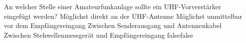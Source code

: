     {An welcher Stelle einer Amateurfunkanlage sollte ein UHF-Vorverstärker eingefügt werden?}
    {Möglichst direkt an der UHF-Antenne}
    {Möglichst unmittelbar vor dem Empfängereingang}
    {Zwischen Senderausgang und Antennenkabel}
    {Zwischen Stehwellenmessgerät und Empfängereingang}
    {false}{false}